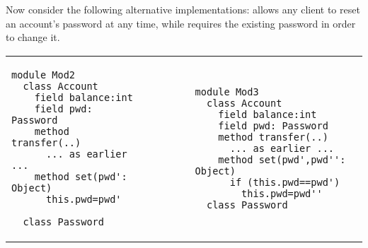  

Now consider the following alternative implementations:
 allows any client to reset an account's password at any time, while
 requires the existing password in order to change it.


  
%
  
  

\begin{tabular}{lll}
\begin{minipage}[b]{0.42\textwidth}
\begin{lstlisting}[language=chainmail, frame=lines]
module Mod2
  class Account
    field balance:int 
    field pwd: Password 
    method transfer(..) 
      ... as earlier ...
    method set(pwd': Object)
      this.pwd=pwd'
      
  class Password
\end{lstlisting}
\end{minipage}
&\ \ \  \ \   &%
\begin{minipage}[b]{0.45\textwidth}
\begin{lstlisting}[language=chainmail, frame=lines]
module Mod3
  class Account
    field balance:int 
    field pwd: Password 
    method transfer(..) 
      ... as earlier ...
    method set(pwd',pwd'': Object)
      if (this.pwd==pwd') 
        this.pwd=pwd''
  class Password
\end{lstlisting}
\end{minipage} 
\end{tabular}

